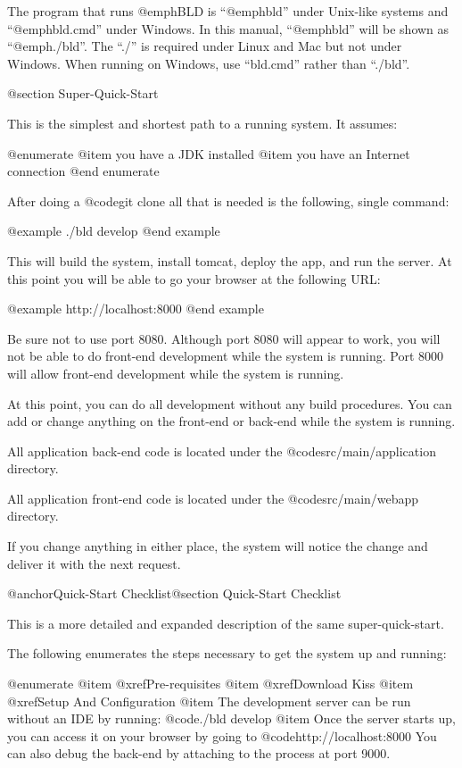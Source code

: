 The program that runs @emph{BLD} is ``@emph{bld}'' under Unix-like
systems and ``@emph{bld.cmd}'' under Windows.  In this manual,
``@emph{bld}'' will be shown as ``@emph{./bld}''.  The ``./'' is
required under Linux and Mac but not under Windows.  When running on
Windows, use ``bld.cmd'' rather than ``./bld''.

@section Super-Quick-Start

This is the simplest and shortest path to a running system.  It assumes:

@enumerate
@item
you have a JDK installed
@item
you have an Internet connection
@end enumerate

After doing a @code{git clone} all that is needed is the following,
single command:

@example
    ./bld  develop
@end example

This will build the system, install tomcat, deploy the app, and run
the server.  At this point you will be able to go your browser at the
following URL:

@example
    http://localhost:8000
@end example

Be sure not to use port 8080.  Although port 8080 will appear to work,
you will not be able to do front-end development while the system is
running.  Port 8000 will allow front-end development while the system
is running.

At this point, you can do all development without any build
procedures.  You can add or change anything on the front-end or
back-end while the system is running.

All application back-end code is located under the @code{src/main/application}
directory.

All application front-end code is located under the @code{src/main/webapp}
directory.

If you change anything in either place, the system will notice the change 
and deliver it with the next request.


@anchor{Quick-Start Checklist}@section Quick-Start Checklist

This is a more detailed and expanded description of the same
super-quick-start.

The following enumerates the steps necessary to get the system up and running:

@enumerate
@item
@xref{Pre-requisites}
@item
@xref{Download Kiss}
@item
@xref{Setup And Configuration}
@item
The development server can be run without an IDE by running: @code{./bld develop}
@item
Once the server starts up, you can access it on your browser by going to 
@code{http://localhost:8000}  You can also debug the back-end by
attaching to the process at port 9000.

